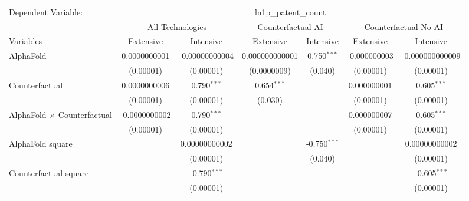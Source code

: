 \begingroup
\centering
\begin{tabular}{lcccccc}
   \tabularnewline \midrule \midrule
   Dependent Variable: & \multicolumn{6}{c}{ln1p\_patent\_count}\\
 & \multicolumn{2}{c}{All Technologies} & \multicolumn{2}{c}{Counterfactual AI} & \multicolumn{2}{c}{Counterfactual No AI} \\
\cmidrule(lr){1-1}\cmidrule(lr){2-3} \cmidrule(lr){4-5} \cmidrule(lr){6-7}
Variables & \multicolumn{1}{c}{Extensive} & \multicolumn{1}{c}{Intensive} & \multicolumn{1}{c}{Extensive} & \multicolumn{1}{c}{Intensive} & \multicolumn{1}{c}{Extensive} & \multicolumn{1}{c}{Intensive} \\
\cmidrule(lr){1-1}\cmidrule(lr){2-2} \cmidrule(lr){3-3} \cmidrule(lr){4-4} \cmidrule(lr){5-5} \cmidrule(lr){6-6} \cmidrule(lr){7-7}
   AlphaFold                          & 0.0000000001  & -0.00000000004 & 0.000000000001 & 0.750$^{***}$  & -0.000000003 & -0.000000000009\\   
                                      & (0.00001)     & (0.00001)      & (0.0000009)    & (0.040)        & (0.00001)    & (0.00001)\\   
   Counterfactual                     & 0.0000000006  & 0.790$^{***}$  & 0.654$^{***}$  &                & 0.000000001  & 0.605$^{***}$\\   
                                      & (0.00001)     & (0.00001)      & (0.030)        &                & (0.00001)    & (0.00001)\\   
   AlphaFold $\times$ Counterfactual  & -0.0000000002 & 0.790$^{***}$  &                &                & 0.000000007  & 0.605$^{***}$\\   
                                      & (0.00001)     & (0.00001)      &                &                & (0.00001)    & (0.00001)\\   
   AlphaFold square                   &               & 0.00000000002  &                & -0.750$^{***}$ &              & 0.00000000002\\   
                                      &               & (0.00001)      &                & (0.040)        &              & (0.00001)\\   
   Counterfactual square              &               & -0.790$^{***}$ &                &                &              & -0.605$^{***}$\\   
                                      &               & (0.00001)      &                &                &              & (0.00001)\\   

\end{tabular}
